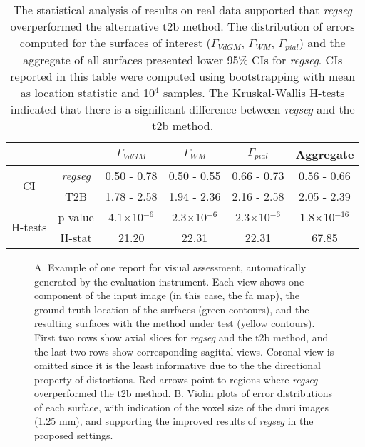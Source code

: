\begin{table}
		\centering
		\footnotesize
		\tabcolsep=0.08cm
    \begin{tabular}{cccccc}
    & & $\Gamma_{VdGM}$  & $\Gamma_{WM}$ & $\Gamma_{pial}$ & Aggregate \\
    \hline
    \multirow{2}{*}{CI}
       & \emph{regseg}        & 0.50 - 0.78 & 0.50 - 0.55 & 0.66 - 0.73 & 0.56 - 0.66 \\
       & T2B                  & 1.78 - 2.58 & 1.94 - 2.36 & 2.16 - 2.58 & 2.05 - 2.39 \\
    \hline
    \multirow{2}{*}{H-tests}
       & p-value  & 4.1$\times$10$^{-6}$& 2.3$\times$10$^{-6}$& 2.3$\times$10$^{-6}$ & 1.8$\times$10$^{-16}$ \\
       & H-stat   & 21.20               & 22.31               & 22.31                & 67.85              \\
    \hline
    \end{tabular}
    \caption{The statistical analysis of results on real data supported that \emph{regseg} overperformed
    the alternative \acrfull{t2b} method.
    The distribution of errors computed for the surfaces of interest ($\Gamma_{VdGM}$, $\Gamma_{WM}$, $\Gamma_{pial}$)
      and the aggregate of all surfaces presented lower 95\% CIs for \emph{regseg}.
    CIs reported in this table were computed using bootstrapping with mean as location statistic and 10$^4$ samples.
    The Kruskal-Wallis H-tests indicated that there is a significant difference between \emph{regseg} and
      the \gls*{t2b} method.
    }\label{tab:results_real}
\end{table}

\begin{figure*}
  \centering
  
  \caption{A. Example of one report for visual assessment, automatically generated by the evaluation instrument.
    Each view shows one component of the input image (in this case, the \gls*{fa} map), the ground-truth location
    of the surfaces (green contours), and the resulting surfaces with the method under test (yellow contours).
  First two rows show axial slices for \emph{regseg} and the \acrfull*{t2b} method, and the last two rows
    show corresponding sagittal views.
  Coronal view is omitted since it is the least informative due to the the directional property
    of distortions.
	Red arrows point to regions where \emph{regseg} overperformed the \gls*{t2b} method.
  B. Violin plots of error distributions of each surface, with indication of the voxel size of the \gls*{dmri} images
    (1.25 mm), and supporting the improved results of \emph{regseg} in the proposed settings.
	}\label{fig:results_real}
\end{figure*}